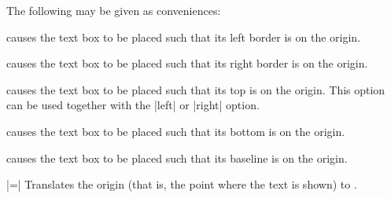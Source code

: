 \begin{command}{\pgftext{}}
  The following  may be given as conveniences:
  \begin{itemize}
    causes the text box to be placed such that its left border is on the origin.
\begin{codeexample}[]
\end{codeexample}
    causes the text box to be placed such that its right border is on the origin.
\begin{codeexample}[]
\end{codeexample}
    causes the text box to be placed such that its top is on the
    origin. This option can be used together with the |left| or
    |right| option.
\begin{codeexample}[]
\end{codeexample}
\begin{codeexample}[]
\end{codeexample}
    causes the text box to be placed such that its bottom is on the
    origin.
\begin{codeexample}[]
\end{codeexample}
\begin{codeexample}[]
\end{codeexample}
    causes the text box to be placed such that its baseline is on the
    origin.
\begin{codeexample}[]
\end{codeexample}
\begin{codeexample}[]
\end{codeexample}
    |=|
      Translates the origin (that is, the point where the text is
      shown) to . 
\begin{codeexample}[]
\end{codeexample}

\end{itemize}
\end{command}
